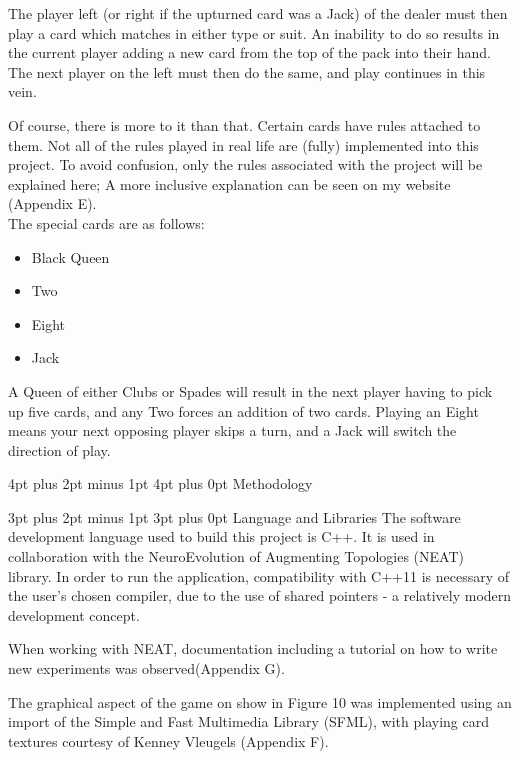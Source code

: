 \documentclass[12pt,a4paper]{article}
\makeatletter
\renewcommand\subsection{\@startsection {subsection}{1}{2mm} %
                               {3pt plus 2pt minus 1pt} %
                               {3pt plus 0pt} %
                               {\normalfont\bfseries}}
\renewcommand\section{\@startsection {section}{1}{0mm} %
                               {4pt plus 2pt minus 1pt} %
                               {4pt plus 0pt} %
                               {\bfseries}}
\makeatother
\begin{document}
The player left (or right if the upturned card was a Jack) of the dealer must then play a card which matches in either type or suit. An inability to do so results in the current player adding a new card from the top of the pack into their hand. The next player on the left must then do the same, and play continues in this vein.

Of course, there is more to it than that. Certain cards have rules attached to them. Not all of the rules played in real life are (fully) implemented into this project. To avoid confusion, only the rules associated with the project will be explained here; A more inclusive explanation can be seen on my website (Appendix E).\\

The special cards are as follows:
\begin{itemize}
	\item Black Queen
	\item Two
	\item Eight
	\item Jack
\end{itemize}

A Queen of either Clubs or Spades will result in the next player having to pick up five cards, and any Two forces an addition of two cards. Playing an Eight means your next opposing player skips a turn, and a Jack will switch the direction of play. 


\newpage
\section{Methodology}


\subsection{Language and Libraries}
The software development language used to build this project is C++. It is used in collaboration with the NeuroEvolution of Augmenting Topologies (NEAT) library. In order to run the application, compatibility with C++11 is necessary of the user's chosen compiler, due to the use of shared pointers - a relatively modern development concept. 

When working with NEAT, documentation including a tutorial on how to write new experiments was observed(Appendix G). 

The graphical aspect of the game on show in Figure 10 was implemented using an import of the Simple and Fast Multimedia Library (SFML), with playing card textures courtesy of Kenney Vleugels (Appendix F).\\
\end{document}
